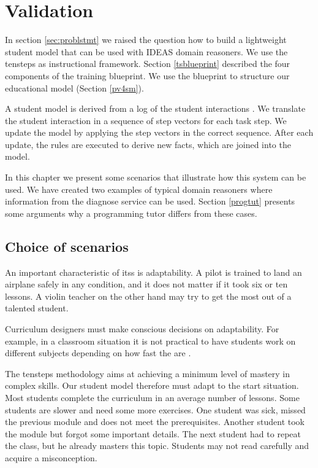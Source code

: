 \chapter{Validation}

In section \ref{sec:problstmt} we raised the question how to build a lightweight student model that can be used with IDEAS domain reasoners.
We use the \gls{tensteps} as instructional framework.
Section \ref{tsblueprint} described the four components of the training blueprint.
We use the blueprint to structure our educational model  (Section \ref{pv4sm}).

A student model is derived from a log of the student interactions \citep{studentModelling}.
We translate the student interaction in a sequence of step vectors for each task step.
We update the model by applying the step vectors in the correct sequence.
After each update,  the rules are executed to derive new facts, which are joined into the model.

In this chapter we present some scenarios that illustrate how this system can be used.
We have created two examples of typical domain reasoners where information from the diagnose service can be used.
Section \ref{progtut} presents some arguments why a programming tutor differs from these cases.

\section{Choice of scenarios}
An important characteristic of \glspl{its} is adaptability.
A pilot is trained to land an airplane safely in any condition, and it does not matter if it took six or ten lessons.
A violin teacher on the other hand may try to get the most out of a talented student.

Curriculum designers must make conscious decisions on adaptability.
For example, in a classroom situation it is not practical to have students work on different subjects depending on how fast the are \citep{vanlehn2006}.

The \gls{tensteps} methodology aims at achieving a minimum level of mastery in complex skills.
Our student model therefore must adapt to the start situation.
Most students complete the curriculum in an average number of lessons.
Some students are slower and need some more exercises.
One student was sick, missed the previous module and does not meet the prerequisites.
Another student took the module but forgot some important details.
The next student had to repeat the class, but he already masters this topic.
Students may not read carefully and acquire a misconception.

